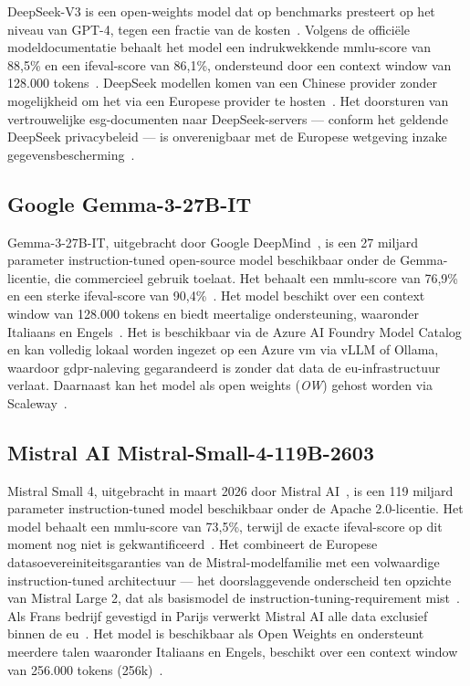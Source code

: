 DeepSeek-V3 is een open-weights model dat op benchmarks presteert op het niveau van GPT-4, tegen een fractie van de kosten~\autocite{DeepSeekAI2024}. Volgens de officiële modeldocumentatie behaalt het model een indrukwekkende \gls{mmlu}-score van 88,5\% en een \gls{ifeval}-score van 86,1\%, ondersteund door een context window van 128.000 tokens~\autocite{DeepSeekAI2024,HuangEtAl2024}. DeepSeek modellen komen van een Chinese provider zonder mogelijkheid om het via een Europese provider te hosten~\autocite{DeepSeekAI2024a}. Het doorsturen van vertrouwelijke \gls{esg}-documenten naar DeepSeek-servers — conform het geldende DeepSeek privacybeleid — is onverenigbaar met de Europese wetgeving inzake gegevensbescherming~\autocite{DeepSeek2026}.

\subsection{Google Gemma-3-27B-IT}

Gemma-3-27B-IT, uitgebracht door Google DeepMind~\autocite{GemmaTeam2025}, is een 27 miljard parameter instruction-tuned open-source model beschikbaar onder de Gemma-licentie, die commercieel gebruik toelaat. Het behaalt een \gls{mmlu}-score van 76,9\% en een sterke \gls{ifeval}-score van 90,4\%~\autocite{GemmaTeam2025}. Het model beschikt over een context window van 128.000 tokens en biedt meertalige ondersteuning, waaronder Italiaans en Engels~\autocite{GemmaTeam2025}. Het is beschikbaar via de Azure AI Foundry Model Catalog en kan volledig lokaal worden ingezet op een Azure \gls{vm} via vLLM of Ollama, waardoor \gls{gdpr}-naleving gegarandeerd is zonder dat data de \gls{eu}-infrastructuur verlaat. Daarnaast kan het model als open weights (\textit{OW}) gehost worden via Scaleway~\autocite{Google2025}.

\subsection{Mistral AI Mistral-Small-4-119B-2603}

Mistral Small 4, uitgebracht in maart 2026 door Mistral AI~\autocite{MistralAI2026}, is een 119 miljard parameter instruction-tuned model beschikbaar onder de Apache 2.0-licentie. Het model behaalt een \gls{mmlu}-score van 73,5\%, terwijl de exacte \gls{ifeval}-score op dit moment nog niet is gekwantificeerd~\autocite{MistralAI2026}. Het combineert de Europese datasoevereiniteitsgaranties van de Mistral-modelfamilie met een volwaardige instruction-tuned architectuur — het doorslaggevende onderscheid ten opzichte van Mistral Large 2, dat als basismodel de instruction-tuning-requirement mist~\autocite{MistralAIzd}. Als Frans bedrijf gevestigd in Parijs verwerkt Mistral AI alle data exclusief binnen de \gls{eu}~\autocite{MistralAI2026}. Het model is beschikbaar als Open Weights en ondersteunt meerdere talen waaronder Italiaans en Engels, beschikt over een context window van 256.000 tokens (256k)~\autocite{MistralAI2026}.

